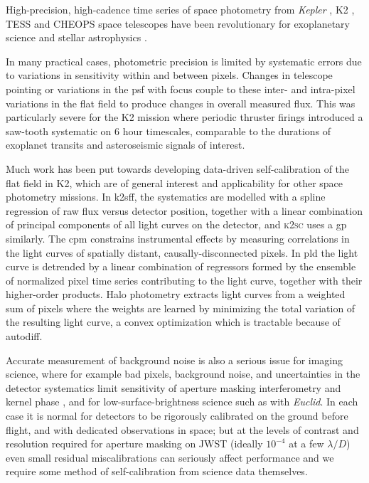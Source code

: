 \documentclass[]{spieman}
\begin{document}
High-precision, high-cadence time series of space photometry from \textit{Kepler} \cite{Borucki2010}, K2 \cite{K2}, TESS \cite{TESS} and CHEOPS \cite{CHEOPS} space telescopes have been revolutionary for exoplanetary science \cite{Zhu2021} and stellar astrophysics \cite{Aerts21,Jackiewicz2021}. 

In many practical cases, photometric precision is limited by systematic errors due to variations in sensitivity within and between pixels. Changes in telescope pointing or variations in the \ac{psf} with focus couple to these inter- and intra-pixel variations in the flat field to produce changes in overall measured flux. This was particularly severe for the K2 mission where periodic thruster firings introduced a saw-tooth systematic on 6 hour timescales, comparable to the durations of exoplanet transits and asteroseismic signals of interest. 

Much work has been put towards developing data-driven self-calibration of the flat field in K2, which are of general interest and applicability for other space photometry missions. 
In \ac{k2sff}, the systematics are modelled with a spline regression of raw flux versus detector position, together with a linear combination of principal components of all light curves on the detector, and \textsc{k2sc} \cite{Aigrain2016} uses a \ac{gp} similarly. 
The \ac{cpm} constrains instrumental effects by measuring correlations in the light curves of spatially distant, causally-disconnected pixels.
In \ac{pld} the light curve is detrended by a linear combination of regressors formed by the ensemble of normalized pixel time series contributing to the light curve, together with their higher-order products.
Halo photometry \cite{halo, halo2} extracts light curves from a weighted sum of pixels where the weights are learned by minimizing the total variation of the resulting light curve, a convex optimization which is tractable because of autodiff.

Accurate measurement of background noise is also a serious issue for imaging science, where for example bad pixels, background noise, and uncertainties in the detector systematics limit sensitivity of aperture masking interferometry and kernel phase \cite{Kammerer2019}, and for low-surface-brightness science such as with \textit{Euclid}\cite{EuclidCollaboration2022}. In each case it is normal for detectors to be rigorously calibrated on the ground before flight, and with dedicated observations in space; but at the levels of contrast and resolution required for aperture masking on JWST (ideally $10^{-4}$ at a few $\lambda/D$) even small residual miscalibrations can seriously affect performance \cite{Sivaramakrishnan2022} and we require some method of self-calibration from science data themselves.
\end{document}
